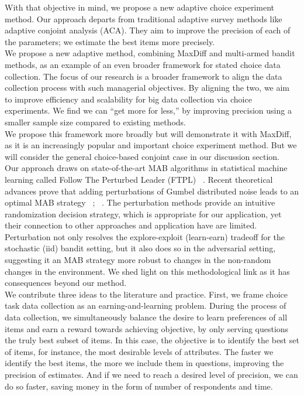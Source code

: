 \documentclass[nonblindrev]{informs3}
\begin{document}
With that objective in mind, we propose a new adaptive choice experiment method. 
Our approach departs from traditional adaptive survey methods like adaptive conjoint analysis (ACA). They aim to improve the precision of each of the parameters; we estimate the best items more precisely. \\
We propose a new adaptive method, combining MaxDiff and multi-armed bandit methods, as an example of an even broader framework for stated choice data collection. The focus of our research is a broader framework to align the data collection process with such managerial objectives. By aligning the two, we aim to improve efficiency and scalability for big data collection via choice experiments. We find we can ``get more for less,'' by improving precision using a smaller sample size compared to existing methods.\\
We propose this framework more broadly but will demonstrate it with MaxDiff, as it is an increasingly popular and important choice experiment method. But we will consider the general choice-based conjoint case in our discussion section. \\
Our approach draws on state-of-the-art MAB algorithms in statistical machine learning called Follow The Perturbed Leader (FTPL) ~\cite{kalai2005efficient}. Recent theoretical advances prove that adding perturbations of Gumbel distributed noise leads to an optimal MAB strategy ~\cite{abernethy2015fighting}; ~\cite{kujala2005following}. The perturbation methods provide an intuitive randomization decision strategy, which is appropriate for our application, yet their connection to other approaches and application have are limited. Perturbation not only resolves the explore-exploit (learn-earn) tradeoff for the stochastic (iid) bandit setting, but it also does so in the adversarial setting, suggesting it an MAB strategy more robust to changes in the non-random changes in the environment. We shed light on this methodological link as it has consequences beyond our method.\\
We contribute three ideas to the literature and practice. First, we frame choice task data collection as an earning-and-learning problem. During the process of data collection, we simultaneously balance the desire to learn preferences of all items and earn a reward towards achieving objective, by only serving questions the truly best subset of items. In this case, the objective is to identify the best set of items, for instance, the most desirable levels of attributes. The faster we identify the best items, the more we include them in questions, improving the precision of estimates. And if we need to reach a desired level of precision, we can do so faster, saving money in the form of number of respondents and time. 
\end{document}
